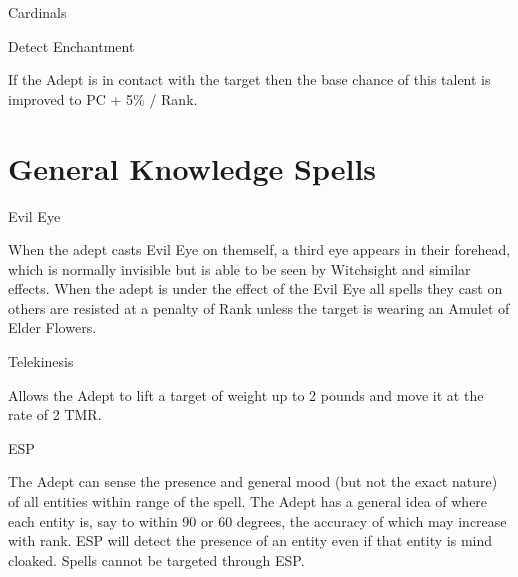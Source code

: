 \documentclass{report}
\begin{document}
\begin{College}{Cardinals}
\begin{talent}[T-2]{Detect Enchantment}
\begin{effects}
If the Adept is in contact with the target then the base chance of
this talent is improved to PC + 5\% / Rank.
\end{effects}
\end{talent}

\section{General Knowledge Spells}

\begin{spell}[G-1]{Evil Eye}

\begin{effects}
When the adept casts Evil Eye on themself, a third eye appears in
their forehead, which is normally invisible but is able to be seen by
Witchsight and similar effects.  When the adept is under the effect of
the Evil Eye all spells they cast on others are resisted at a penalty
of Rank unless the target is wearing an Amulet of Elder Flowers.
\end{effects}
\end{spell}


\begin{spell}[G-2]{Telekinesis}
\begin{effects}
Allows the Adept to lift a target of weight up to 2 pounds and move it
at the rate of 2 TMR.
\end{effects}
\end{spell}

\begin{spell}[G-3]{ESP}

\begin{effects}
The Adept can sense the presence and general mood (but not the exact
nature) of all entities within range of the spell.  The Adept has a
general idea of where each entity is, say to within 90 or 60 degrees,
the accuracy of which may increase with rank.  ESP will detect the
presence of an entity even if that entity is mind cloaked. Spells
cannot be targeted through ESP.
\end{effects}
\end{spell}


\end{College}
\end{document}
